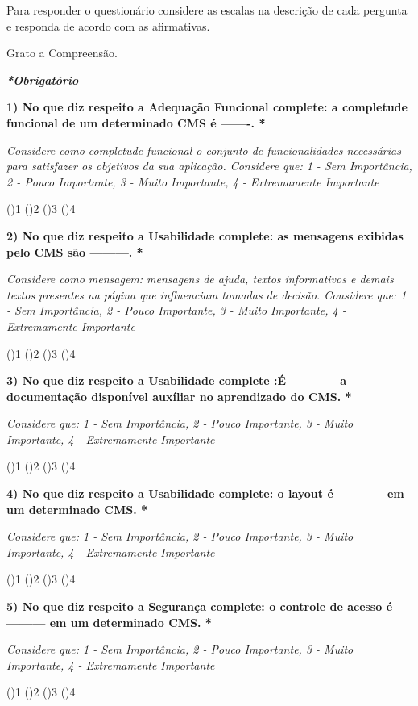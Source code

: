\begin{apendicesenv}
Para responder o questionário considere as escalas na descrição de cada pergunta e responda de acordo com as afirmativas.

Grato a Compreensão. 



\textit{\textbf{*Obrigatório}}

\textbf{1) No que diz respeito a Adequação Funcional complete: a completude funcional de um determinado CMS é -------. *}

\textit{Considere como completude funcional o conjunto de funcionalidades necessárias para satisfazer os objetivos da sua aplicação. Considere que: 1 - Sem Importância, 2 - Pouco Importante, 3 - Muito Importante, 4 - Extremamente Importante}

()1
()2
()3
()4




\textbf{2) No que diz respeito a Usabilidade complete: as mensagens exibidas pelo CMS são ---------. *}

\textit{Considere como mensagem: mensagens de ajuda, textos informativos e demais textos presentes na página que influenciam tomadas de decisão. Considere que: 1 - Sem Importância, 2 - Pouco Importante, 3 - Muito Importante, 4 - Extremamente Importante}

()1
()2
()3
()4




\textbf{3) No que diz respeito a Usabilidade complete :É ----------- a documentação disponível auxíliar no aprendizado do CMS. *}

\textit{Considere que: 1 - Sem Importância, 2 - Pouco Importante, 3 - Muito Importante, 4 - Extremamente Importante}

()1
()2
()3
()4




\textbf{4) No que diz respeito a Usabilidade complete: o layout é ----------- em um determinado CMS. *}

\textit{Considere que: 1 - Sem Importância, 2 - Pouco Importante, 3 - Muito Importante, 4 - Extremamente Importante}

()1
()2
()3
()4




\textbf{5) No que diz respeito a Segurança complete: o controle de acesso é --------- em um determinado CMS. *}

\textit{Considere que: 1 - Sem Importância, 2 - Pouco Importante, 3 - Muito Importante, 4 - Extremamente Importante}

()1
()2
()3
()4





\end{apendicesenv}
